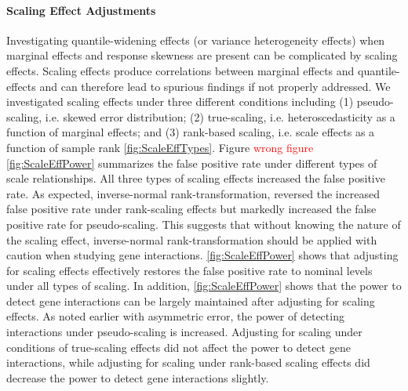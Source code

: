 \documentclass[12pt]{article}
\begin{document}
\paragraph{Scaling Effect Adjustments} Investigating quantile-widening effects (or variance heterogeneity effects) when marginal effects and response skewness are present can be complicated by scaling effects. Scaling effects produce correlations between marginal effects and quantile-effects and can therefore lead to spurious findings if not properly addressed. We investigated scaling effects under three different conditions including (1) pseudo-scaling, i.e. skewed error distribution; (2) true-scaling, i.e. heteroscedasticity as a function of marginal effects; and (3) rank-based scaling, i.e. scale effects as a function of sample rank \ref{fig:ScaleEffTypes}. Figure \textcolor{red}{wrong figure} \ref{fig:ScaleEffPower} summarizes the false positive rate under different types of scale relationships. All three types of scaling effects increased the false positive rate. As expected, inverse-normal rank-transformation, reversed the increased false positive rate under rank-scaling effects but markedly increased the false positive rate for pseudo-scaling. This suggests that without knowing the nature of the scaling effect, inverse-normal rank-transformation should be applied with caution when studying gene interactions. \ref{fig:ScaleEffPower} shows that adjusting for scaling effects effectively restores the false positive rate to nominal levels under all types of scaling. In addition, \ref{fig:ScaleEffPower} shows that the power to detect gene interactions can be largely maintained after adjusting for scaling effects. As noted earlier with asymmetric error, the power of detecting interactions under pseudo-scaling is increased. Adjusting for scaling under conditions of true-scaling effects did not affect the power to detect gene interactions, while adjusting for scaling under rank-based scaling effects did decrease the power to detect gene interactions slightly. 
\end{document}
